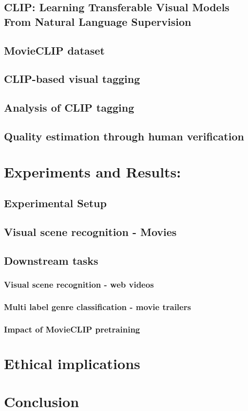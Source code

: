\subsection{CLIP: Learning Transferable Visual Models From Natural Language Supervision}
\subsection{MovieCLIP dataset}
\subsection{CLIP-based visual tagging}
\subsection{Analysis of CLIP tagging}
\subsection{Quality estimation through human verification}
\section{Experiments and Results:}
\subsection{Experimental Setup}
\subsection{Visual scene recognition - Movies}
\subsection{Downstream tasks}
\subsubsection{Visual scene recognition - web videos}
\subsubsection{Multi label genre classification - movie trailers}
\subsubsection{Impact of MovieCLIP pretraining}
\section{Ethical implications}
\section{Conclusion}
